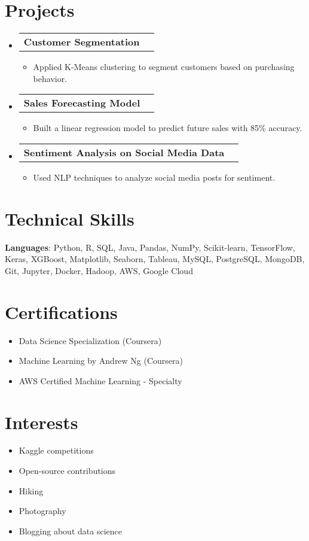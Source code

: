 \documentclass[letterpaper,11pt]{article}
\makeatletter
\newcommand{\resumeItem}[1]{
  \item\small{
    {#1 \vspace{-2pt}}
  }
}
\newcommand{\resumeProjectHeading}[2]{
    \item
    \begin{tabular*}{0.97\textwidth}{l@{\extracolsep{\fill}}r}
      \small#1 & #2 \\
    \end{tabular*}\vspace{-7pt}
}
\newcommand{\resumeSubHeadingListStart}{\begin{itemize}[leftmargin=0.15in, label={}]}
\newcommand{\resumeSubHeadingListEnd}{\end{itemize}}
\newcommand{\resumeItemListStart}{\begin{itemize}}
\newcommand{\resumeItemListEnd}{\end{itemize}\vspace{-5pt}}
\makeatother
\begin{document}
\section{Projects}
    \resumeSubHeadingListStart
      \resumeProjectHeading
          {\textbf{Customer Segmentation}}{}
          \resumeItemListStart
            \resumeItem{Applied K-Means clustering to segment customers based on purchasing behavior.}
          \resumeItemListEnd
      \resumeProjectHeading
          {\textbf{Sales Forecasting Model}}{}
          \resumeItemListStart
            \resumeItem{Built a linear regression model to predict future sales with 85\% accuracy.}
          \resumeItemListEnd
      \resumeProjectHeading
          {\textbf{Sentiment Analysis on Social Media Data}}{}
          \resumeItemListStart
            \resumeItem{Used NLP techniques to analyze social media posts for sentiment.}
          \resumeItemListEnd
    \resumeSubHeadingListEnd



\section{Technical Skills}
 \begin{itemize}[leftmargin=0.15in, label={}]
    \small{\item{
     \textbf{Languages}{: Python, R, SQL, Java, Pandas, NumPy, Scikit-learn, TensorFlow, Keras, XGBoost, Matplotlib, Seaborn, Tableau, MySQL, PostgreSQL, MongoDB, Git, Jupyter, Docker, Hadoop, AWS, Google Cloud} 
    }}
 \end{itemize}

\section{Certifications}
\begin{itemize}[leftmargin=0.15in, label={}]
    \item \small{Data Science Specialization (Coursera)}
    \item \small{Machine Learning by Andrew Ng (Coursera)}
    \item \small{AWS Certified Machine Learning - Specialty}
\end{itemize}

\section{Interests}
\begin{itemize}[leftmargin=0.15in, label={}]
    \item \small{Kaggle competitions}
    \item \small{Open-source contributions}
    \item \small{Hiking}
    \item \small{Photography}
    \item \small{Blogging about data science}
\end{itemize}


\end{document}
